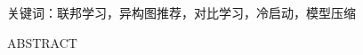 \vspace{0.8em}
\begin{flushleft}
\xiaosihao\heiti 关键词：\xiaosihao\songti 联邦学习，异构图推荐，对比学习，冷启动，模型压缩
\end{flushleft}
\newpage
{}
\vspace{\AbstractTopVSpace}
\begin{center}
    \centering
    {\sanhao\heiti ABSTRACT}
\end{center}
\vspace{\AbstractTitleBodyVSpace}

{}

